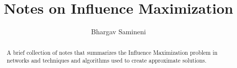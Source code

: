 \documentclass[11pt]{article}
\title{Notes on Influence Maximization}
\author{Bhargav Samineni}
\date{}
\begin{document}
    \maketitle
    \begin{abstract}
        A brief collection of notes that summarizes the \textsf{Influence Maximization} problem in networks 
        and techniques and algorithms used to create approximate solutions. 
    \end{abstract}
    
    
    
    \newpage
    
    \newpage 
    

    \newpage
    \appendix
    

    \newpage
    \printbibliography
\end{document}
